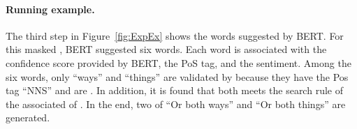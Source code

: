 \paragraph{Running example.} The third step in Figure~\ref{fig:ExpEx} shows the words suggested
by BERT. For this masked \sent, BERT suggested six words. Each word
is associated with the confidence score provided by BERT, the PoS tag,
and the sentiment. Among the six words, only ``ways'' and ``things''
are validated by \tool{} because they have the Pos tag ``NNS'' and are
\neu. In addition, it is found that both \sents meets the search
rule of the associated \lc of \SareqExOne. In the end, two \sents
of ``Or both ways'' and ``Or both things'' are generated.



